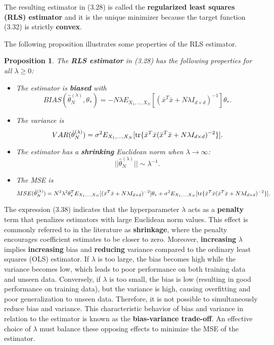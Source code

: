 \documentclass{report}
\newtheorem{proposition}{Proposition}[chapter]
\begin{document}
The resulting estimator in (3.28) is called the \textbf{regularized least squares (RLS) estimator} and it is the unique minimizer because the target function (3.32) is strictly \textbf{convex}.

The following proposition illustrates some properties of the RLS estimator.

\begin{proposition}
The \textbf{RLS estimator} in (3.28) has the following properties for all $\lambda \geq 0$:
\begin{itemize}
\item The estimator is \textbf{biased} with
\begin{equation}
BIAS(\hat{\theta}_N^{(\lambda)}, \theta_*) = -N\lambda E_{X_1,\dots,X_N}[(\bar{x}^T\bar{x}+N\lambda I_{d\times d})^{-1}]\theta_*.
\end{equation}
\item The variance is
\begin{equation}
VAR(\hat{\theta}_N^{(\lambda)}) = \sigma^2E_{X_1,\dots,X_N}[\textup{tr}\{\bar{x}^T\bar{x}(\bar{x}^T\bar{x}+N\lambda I_{d\times d})^{-2}\}].
\end{equation}
\item The estimator has a \textbf{shrinking} Euclidean norm when $\lambda \to \infty$:
\begin{equation}
||\hat{\theta}_N^{(\lambda)}|| \sim \lambda^{-1}.
\end{equation}
\item The MSE is
\begin{equation}
MSE(\hat{\theta}_N^{(\lambda)}) = N^2\lambda^2\theta_*^TE_{X_1,\dots,X_N}[(\bar{x}^T\bar{x}+N\lambda I_{d\times d})^{-2}]\theta_* +  \sigma^2E_{X_1,\dots,X_N}[\textup{tr}\{\bar{x}^T\bar{x}(\bar{x}^T\bar{x}+N\lambda I_{d\times d})^{-2}\}].
\end{equation}
\end{itemize}
\end{proposition}

The expression (3.38) indicates that the hyperparameter $\lambda$ acts as a \textbf{penalty} term that penalizes estimators with large Euclidean norm values. This effect is commonly referred to in the literature as \textbf{shrinkage}, where the penalty encourages coefficient estimates to be closer to zero. Moreover, \textbf{increasing} $\lambda$ implies \textbf{increasing} bias and \textbf{reducing} variance compared to the ordinary least squares (OLS) estimator. If $\lambda$ is too large, the bias becomes high while the variance becomes low, which leads to poor performance on both training data and unseen data. Conversely, if $\lambda$ is too small, the bias is low (resulting in good performance on training data), but the variance is high, causing overfitting and poor generalization to unseen data. Therefore, it is not possible to simultaneously reduce bias and variance. This characteristic behavior of bias and variance in relation to the estimator is known as the \textbf{bias-variance trade-off}. An effective choice of $\lambda$ must balance these opposing effects to minimize the MSE of the estimator.
\end{document}
